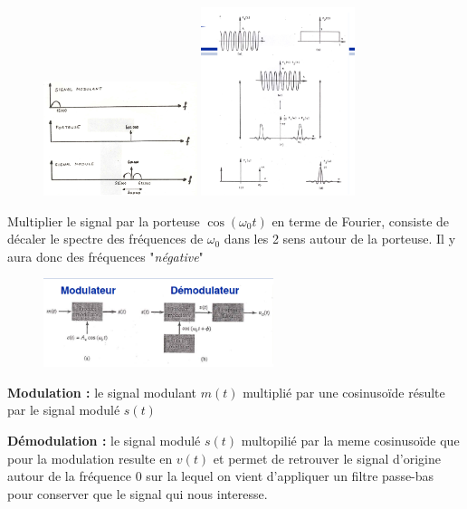 		\begin{figure}[htp]
			\centering
			\includegraphics[width=0.4\textwidth]{img/modulationAM1.png}
			\includegraphics[width=0.4\textwidth]{img/modulationAM2.png}

		\end{figure}
			
		Multiplier le signal par la porteuse $\cos(\omega_0 t)$ en terme de Fourier, consiste de décaler le spectre des fréquences de $\omega_0$ dans les 2 sens autour de la porteuse. Il y aura donc des fréquences "\textit{négative}"
			
		\begin{figure}[htp]
			\centering
			\includegraphics[width=0.6\textwidth]{img/modulationAM3.png}
		\end{figure}
		
		\textbf{Modulation :} le signal modulant $m(t)$ multiplié par une cosinusoïde résulte par le signal modulé $s(t)$
	
		\textbf{Démodulation :} le signal modulé $s(t)$ multopilié par la meme cosinusoïde que pour la modulation resulte en $v(t)$ et permet de retrouver le signal d'origine autour de la fréquence 0 sur la lequel on vient d'appliquer un filtre passe-bas pour conserver que le signal qui nous interesse.
			
